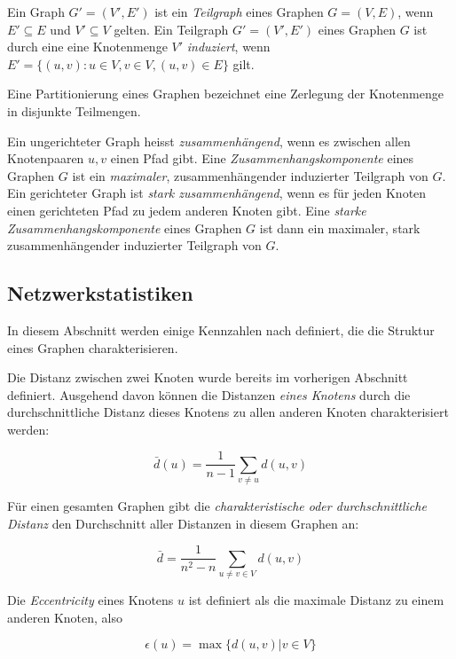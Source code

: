Ein Graph $G' = (V', E')$ ist ein \emph{Teilgraph} eines Graphen $G =
(V, E)$, wenn $E' \subseteq E$ und $V' \subseteq V$ gelten. Ein
Teilgraph $G' = (V', E')$ eines Graphen $G$ ist durch eine eine
Knotenmenge $V'$ \emph{induziert}, wenn $E' = \{(u, v) : u \in V, v
\in V, (u, v) \in E\}$ gilt.

Eine Partitionierung eines Graphen bezeichnet eine Zerlegung der
Knotenmenge in disjunkte Teilmengen.

Ein ungerichteter Graph heisst \emph{zusammenh\"angend}, wenn es
zwischen allen Knotenpaaren $u, v$ einen Pfad gibt. Eine
\emph{Zusammenhangskomponente} eines Graphen $G$ ist ein
\emph{maximaler}, zusammenh\"angender induzierter Teilgraph von
$G$. Ein gerichteter Graph ist \emph{stark zusammenh\"angend}, wenn es
f\"ur jeden Knoten einen gerichteten Pfad zu jedem anderen Knoten gibt. Eine
\emph{starke Zusammenhangskomponente} eines Graphen $G$ ist dann ein
maximaler, stark zusammenh\"angender induzierter Teilgraph von $G$.

\subsection{Netzwerkstatistiken}
\label{ch:Grundlagen:sec:Netzwerkanalyse:subsec:Statistiken}

In diesem Abschnitt werden einige Kennzahlen nach
\cite{Brinkmeier2004} definiert, die die Struktur eines Graphen
charakterisieren.

Die Distanz zwischen zwei Knoten wurde bereits im vorherigen Abschnitt
definiert. Ausgehend davon k\"onnen die Distanzen \emph{eines Knotens}
durch die durchschnittliche Distanz dieses Knotens zu allen anderen
Knoten charakterisiert werden:

\begin{equation}
  \label{eq:1}
  \bar{d}(u) = \frac{1}{n-1} \sum_{v \ne u} d(u, v)
\end{equation}

F\"ur einen gesamten Graphen gibt die \emph{charakteristische oder
  durchschnittliche Distanz} den Durchschnitt aller Distanzen in
diesem Graphen an:

\begin{equation}
  \label{eq:2}
  \bar{d} = \frac{1}{n^2 - n} \sum_{u \ne v \in V} d(u, v)
\end{equation}

Die \emph{Eccentricity} eines Knotens $u$ ist definiert als die
maximale Distanz zu einem anderen Knoten, also

\begin{equation}
  \label{eq:3}
  \epsilon(u) = \max\{d(u,v) | v \in V\}
\end{equation}

